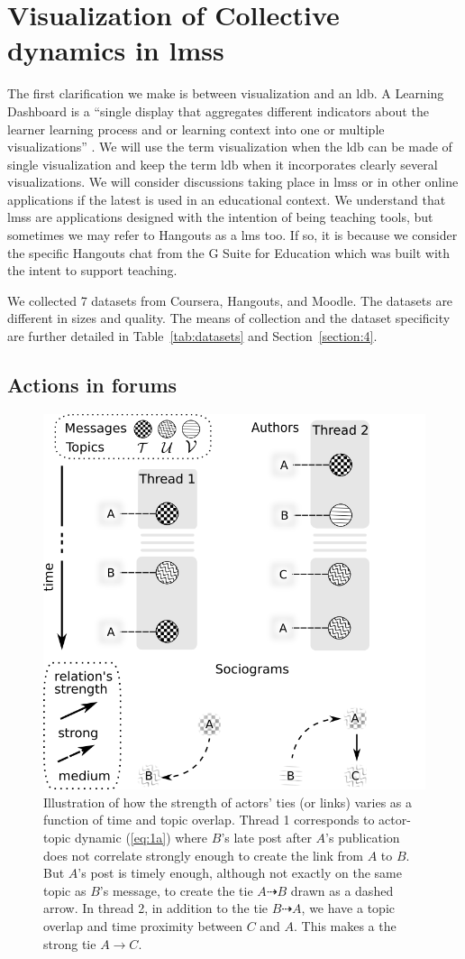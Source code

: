 \documentclass[a4paper,twoside]{article}
\begin{document}
\section{Visualization of Collective dynamics in \glspl{lms}}
\label{section:2}

The first clarification we make is between visualization and an \gls{ldb}.  A Learning Dashboard is a ``single display that aggregates different indicators about the learner learning process and or learning context into one or multiple visualizations'' \citep{Schwendimann2017}.  We will use the term visualization when the \gls{ldb} can be made of single visualization and keep the term \gls{ldb} when it incorporates clearly several visualizations.  
We will consider discussions taking place in \glspl{lms} or in other online applications if the latest is used in an educational context.  We understand that \glspl{lms} are applications designed with the intention of being teaching tools, but sometimes we may refer to Hangouts as a \gls{lms} too.   If so, it is because we consider the specific Hangouts chat from the G Suite for Education which was built with the intent to support teaching.

We collected 7 datasets from Coursera, Hangouts, and Moodle.  The datasets are different in sizes and quality.  The means of collection and the dataset specificity are further detailed in Table~\ref{tab:datasets} and Section~\ref{section:4}.  

\subsection{Actions in forums}

\begin{figure}[b]
 \small{
  \caption{\label{fig:discussion}
   Illustration of how the strength of actors' ties (or links) varies as a function of time and topic overlap.  Thread 1 corresponds to actor-topic dynamic (\ref{eq:1a}) where $B$'s late post after $A$'s  publication does not correlate strongly enough to create the link from $A$ to $B$.  But $A$'s  post is timely enough, although not exactly on the same topic as $B$'s message, to create the tie $A \dashrightarrow B$ drawn as a dashed arrow.  In thread 2, in addition to the tie $B \dashrightarrow A$, we have a topic overlap and time proximity between $C$ and $A$.  This makes a the strong tie $A \to C$.
  }}
 \centering
 \includegraphics[width=.45\textwidth]{images/discussion.png}
\end{figure}
\end{document}
